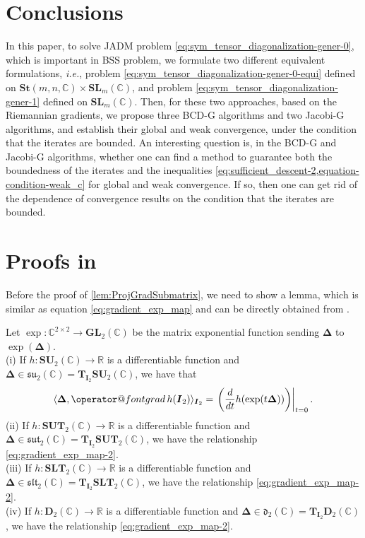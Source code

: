 \documentclass[final,onefignum,onetabnum]{siamart190516}
\makeatletter
\newcommand{\matr}[1]{\boldsymbol{#1}}
\newcommand{\ProjGrad}[2]{\mathop{{\operator@font grad} }#1(#2)}
\newcommand{\RR}{\mathbb{R}}
\newcommand{\CC}{\mathbb{C}}
\newcommand{\Tang}[2]{\mathbf{T}_{#1}{#2}}
\newcommand{\SUNN}[1]{\mathbf{SU}_{#1}}
\newcommand{\GL}{\mathbf{GL}}
\newcommand{\SL}{\mathbf{SL}}
\newcommand{\St}{\mathbf{St}}
\newcommand{\SUT}{\mathbf{SUT}}
\newcommand{\SLT}{\mathbf{SLT}}
\newcommand{\DT}{\mathbf{D}}
\newcommand{\sut}{\mathfrak{sut}}
\newcommand{\slt}{\mathfrak{slt}}
\newcommand{\su}{\mathfrak{su}}
\newcommand{\sdt}{\mathfrak{d}}
\makeatother
\begin{document}
\section{Conclusions}\label{sec:conclusion}

In this paper, to solve JADM problem \cref{eq:sym_tensor_diagonalization-gener-0}, which is important in BSS problem, we formulate two different equivalent formulations, \emph{i.e.}, problem \cref{eq:sym_tensor_diagonalization-gener-0-equi} defined on $\St(m,n,\CC)\times\SL_{m}(\CC)$, and problem \cref{eq:sym_tensor_diagonalization-gener-1} defined on $\SL_{m}(\CC)$. Then, for these two approaches, based on the Riemannian gradients, we propose three BCD-G algorithms and two Jacobi-G algorithms, and establish their global and weak convergence, under the condition that the iterates are bounded. 
An interesting question is, in the BCD-G and Jacobi-G algorithms, whether one can find a method to guarantee both the boundedness of the iterates and the inequalities \cref{eq:sufficient_descent-2,equation-condition-weak_c} for global and weak convergence. 
If so, then one can get rid of the dependence of convergence results on the condition that the iterates are bounded.  

\appendix

\section{Proofs in }\label{sec:ml_proofs_wellness_Jaco_part_01} Before the proof of \cref{lem:ProjGradSubmatrix}, we need to show a lemma, which is similar as equation \cref{eq:gradient_exp_map} and can be directly obtained from \cite[Eq. (3.31)]{absil2009optimization}. 

\begin{lemma}\label{lem:gra_rela_elem}
Let $\exp: \CC^{2\times 2}  \to \GL_{2}(\CC)$ 
be the matrix exponential function \cite{absil2009optimization,baker2012matrix,Hall15:lie} sending $\matr{\Delta}$ to
$\exp(\matr{\Delta})$. \\
(i) If $h:\SUNN{2}(\CC)\to\RR$ is a differentiable function and $\matr{\Delta}\in\su_2(\CC)= \Tang{\matr{I}_2}{\SUNN{2}(\CC)}$, we have that 
\begin{equation}\label{eq:gradient_exp_map-2}
\langle\matr{\Delta},\ProjGrad{h}{\matr{I}_2}\rangle_{\matr{I}_2}  =
\left.\left( \frac{d}{dt} h (\exp(t\matr{\Delta}) )\right)\right|_{t=0}. 
\end{equation}
(ii) If $h:\SUT_2(\CC)\to\RR$ is a differentiable function and $\matr{\Delta}\in\sut_2(\CC)= \Tang{\matr{I}_2}{\SUT_2(\CC)}$, we have the relationship \cref{eq:gradient_exp_map-2}. \\ 
(iii) If $h:\SLT_2(\CC)\to\RR$ is a differentiable function and $\matr{\Delta}\in\slt_2(\CC)= \Tang{\matr{I}_2}{\SLT_2(\CC)}$, we have the relationship \cref{eq:gradient_exp_map-2}.\\ 
(iv) If $h:\DT_2(\CC)\to\RR$ is a differentiable function and $\matr{\Delta}\in\sdt_2(\CC)= \Tang{\matr{I}_2}{\DT_2(\CC)}$, we have the relationship \cref{eq:gradient_exp_map-2}. 
\end{lemma}
\end{document}
